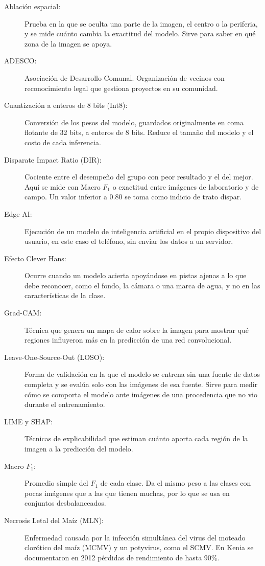 \begin{singlespace}
\begin{description}
\item[Ablaci\'on espacial:] Prueba en la que se oculta una parte de la imagen, el centro o la periferia, y se mide cu\'anto cambia la exactitud del modelo. Sirve para saber en qu\'e zona de la imagen se apoya.
\item[ADESCO:] Asociaci\'on de Desarrollo Comunal. Organizaci\'on de vecinos con reconocimiento legal que gestiona proyectos en su comunidad.
\item[Cuantizaci\'on a enteros de 8 bits (Int8):] Conversi\'on de los pesos del modelo, guardados originalmente en coma flotante de 32 bits, a enteros de 8 bits. Reduce el tama\~no del modelo y el costo de cada inferencia.
\item[Disparate Impact Ratio (DIR):] Cociente entre el desempe\~no del grupo con peor resultado y el del mejor. Aqu\'i se mide con Macro $F_1$ o exactitud entre im\'agenes de laboratorio y de campo. Un valor inferior a 0.80 se toma como indicio de trato dispar.
\item[Edge AI:] Ejecuci\'on de un modelo de inteligencia artificial en el propio dispositivo del usuario, en este caso el tel\'efono, sin enviar los datos a un servidor.
\item[Efecto Clever Hans:] Ocurre cuando un modelo acierta apoy\'andose en pistas ajenas a lo que debe reconocer, como el fondo, la c\'amara o una marca de agua, y no en las caracter\'isticas de la clase.
\item[Grad-CAM:] T\'ecnica que genera un mapa de calor sobre la imagen para mostrar qu\'e regiones influyeron m\'as en la predicci\'on de una red convolucional.
\item[Leave-One-Source-Out (LOSO):] Forma de validaci\'on en la que el modelo se entrena sin una fuente de datos completa y se eval\'ua solo con las im\'agenes de esa fuente. Sirve para medir c\'omo se comporta el modelo ante im\'agenes de una procedencia que no vio durante el entrenamiento.
\item[LIME y SHAP:] T\'ecnicas de explicabilidad que estiman cu\'anto aporta cada regi\'on de la imagen a la predicci\'on del modelo.
\item[Macro $F_1$:] Promedio simple del $F_1$ de cada clase. Da el mismo peso a las clases con pocas im\'agenes que a las que tienen muchas, por lo que se usa en conjuntos desbalanceados.
\item[Necrosis Letal del Ma\'iz (MLN):] Enfermedad causada por la infecci\'on simult\'anea del virus del moteado clor\'otico del ma\'iz (MCMV) y un potyvirus, como el SCMV. En Kenia se documentaron en 2012 p\'erdidas de rendimiento de hasta 90\%.

\end{description}
\end{singlespace}
